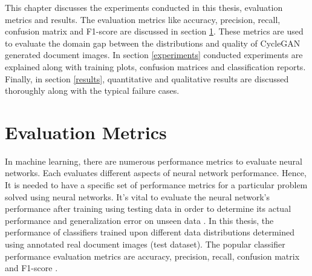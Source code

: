\setlength{\parskip}{1em}

This chapter discusses the experiments conducted in this thesis, evaluation metrics and results. The evaluation metrics like accuracy, precision, recall, confusion matrix and F1-score are discussed in section \ref{EvaluationMetrics}. These metrics are used to evaluate the domain gap between the distributions and quality of \ac{CycleGAN} generated document images. In section \ref{experiments} conducted experiments are explained along with training plots, confusion matrices and classification reports. Finally, in section \ref{results}, quantitative and qualitative results are discussed thoroughly along with the typical failure cases.

\section{Evaluation Metrics}\label{EvaluationMetrics}


In machine learning, there are numerous performance metrics to evaluate neural networks. Each evaluates different aspects of neural network performance. Hence, It is needed to have a specific set of performance metrics for a particular problem solved using neural networks. It's vital to evaluate the neural network's performance after training using testing data in order to determine its actual performance and generalization error on unseen data \cite{powers2020evaluation}. In this thesis, the performance of classifiers trained upon different data distributions determined using annotated real document images (test dataset). The popular classifier performance evaluation metrics are accuracy, precision, recall, confusion matrix and F1-score \cite{powers2020evaluation}. 


